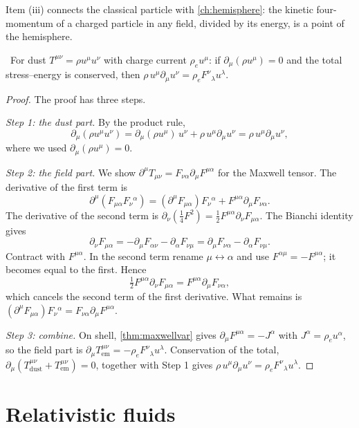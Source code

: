 Item (iii) connects the classical particle with \cref{ch:hemisphere}: the kinetic four-momentum of a charged particle in any field, divided by its energy, is a point of the hemisphere.

\begin{proposition}\label{prop:dust}\ver\
For dust $T^{\mu\nu}=\rho u^\mu u^\nu$ with charge current $\rho_eu^\mu$: if $\partial_\mu(\rho u^\mu)=0$ and the total stress--energy is conserved, then $\rho\,u^\mu\partial_\mu u^\nu=\rho_eF^\nu{}_\lambda u^\lambda$.
\end{proposition}
\begin{proof}
The proof has three steps.

\emph{Step 1: the dust part.} By the product rule,
\[
\partial_\mu(\rho u^\mu u^\nu)=\partial_\mu(\rho u^\mu)\,u^\nu+\rho\,u^\mu\partial_\mu u^\nu=\rho\,u^\mu\partial_\mu u^\nu ,
\]
where we used $\partial_\mu(\rho u^\mu)=0$.

\emph{Step 2: the field part.} We show $\partial^\mu T_{\mu\nu}=F_{\nu\alpha}\partial_\mu F^{\mu\alpha}$ for the Maxwell tensor. The derivative of the first term is
\[
\partial^\mu(F_{\mu\alpha}F_\nu{}^\alpha)=(\partial^\mu F_{\mu\alpha})F_\nu{}^\alpha+F^{\mu\alpha}\partial_\mu F_{\nu\alpha}.
\]
The derivative of the second term is $\partial_\nu(\frac14F^2)=\frac12F^{\mu\alpha}\partial_\nu F_{\mu\alpha}$. The Bianchi identity gives
\[
\partial_\nu F_{\mu\alpha}=-\partial_\mu F_{\alpha\nu}-\partial_\alpha F_{\nu\mu}=\partial_\mu F_{\nu\alpha}-\partial_\alpha F_{\nu\mu}.
\]
Contract with $F^{\mu\alpha}$. In the second term rename $\mu\leftrightarrow\alpha$ and use $F^{\alpha\mu}=-F^{\mu\alpha}$; it becomes equal to the first. Hence
\[
\tfrac12F^{\mu\alpha}\partial_\nu F_{\mu\alpha}=F^{\mu\alpha}\partial_\mu F_{\nu\alpha},
\]
which cancels the second term of the first derivative. What remains is $(\partial^\mu F_{\mu\alpha})F_\nu{}^\alpha=F_{\nu\alpha}\partial_\mu F^{\mu\alpha}$.

\emph{Step 3: combine.} On shell, \cref{thm:maxwellvar} gives $\partial_\mu F^{\mu\alpha}=-J^\alpha$ with $J^\alpha=\rho_eu^\alpha$, so the field part is $\partial_\mu T_{\mathrm{em}}^{\mu\nu}=-\rho_eF^\nu{}_\lambda u^\lambda$. Conservation of the total, $\partial_\mu(T_{\mathrm{dust}}^{\mu\nu}+T_{\mathrm{em}}^{\mu\nu})=0$, together with Step 1 gives $\rho\,u^\mu\partial_\mu u^\nu=\rho_eF^\nu{}_\lambda u^\lambda$.
\end{proof}


\section{Relativistic fluids}

